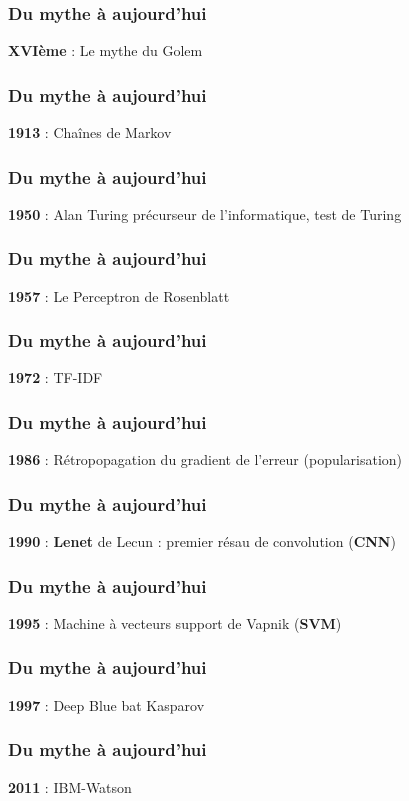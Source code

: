 \begin{frame}
  \frametitle{Du mythe à aujourd'hui}
  \textbf{XVIème} : Le mythe du Golem
\end{frame}

\begin{frame}
  \frametitle{Du mythe à aujourd'hui}
  \textbf{1913} : Chaînes de Markov
\end{frame}

\begin{frame}
  \frametitle{Du mythe à aujourd'hui}
  \textbf{1950} : Alan Turing
  précurseur de l'informatique, test de Turing
\end{frame}

\begin{frame}
  \frametitle{Du mythe à aujourd'hui}
  \textbf{1957} : Le Perceptron de Rosenblatt
\end{frame}

\begin{frame}
  \frametitle{Du mythe à aujourd'hui}
  \textbf{1972} :  TF-IDF
\end{frame}

\begin{frame}
  \frametitle{Du mythe à aujourd'hui}
  \textbf{1986} : Rétropopagation du gradient de l'erreur (popularisation)
\end{frame}

\begin{frame}
  \frametitle{Du mythe à aujourd'hui}
  \textbf{1990} : \textbf{Lenet} de Lecun : premier résau de convolution (\textbf{CNN})
\end{frame}

\begin{frame}
  \frametitle{Du mythe à aujourd'hui}
  \textbf{1995} : Machine à vecteurs support de Vapnik (\textbf{SVM})
\end{frame}

\begin{frame}
  \frametitle{Du mythe à aujourd'hui}
  \textbf{1997} : Deep Blue bat Kasparov
\end{frame}

\begin{frame}
  \frametitle{Du mythe à aujourd'hui}
  \textbf{2011} : IBM-Watson
\end{frame}

